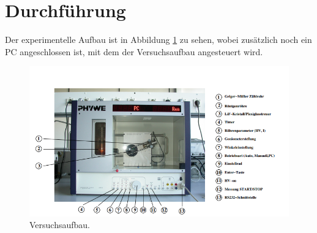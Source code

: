 \section{Durchführung}
\label{sec:Durchführung}
Der experimentelle Aufbau ist in Abbildung \ref{fig:Aufbau} zu sehen, wobei zusätzlich noch ein PC angeschlossen ist, mit 
dem der Versuchsaufbau angesteuert wird.
\begin{figure}[H]
    \centering
    \includegraphics[scale=1]{content/Aufbau.png}
    \caption{Versuchsaufbau\cite{sample}.}
    \label{fig:Aufbau}
\end{figure}

